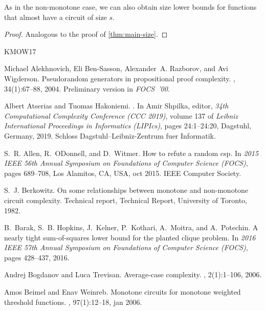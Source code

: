 \documentclass[10pt,a4paper]{article}
\theoremstyle{plain}
\theoremstyle{remark}
\theoremstyle{definition}
\begin{document}
As in the non-monotone case, we can also obtain size lower bounds for
functions that almost have a circuit of size $s$.

\MonotoneSize*

\begin{proof}
  Analogous to the proof of \cref{thm:main-size}.
\end{proof}

\newcommand{\etalchar}[1]{$^{#1}$}
\begin{thebibliography}{KMOW17}

Michael Alekhnovich, Eli {Ben-Sasson}, Alexander~A. Razborov, and Avi
  Wigderson.
\newblock Pseudorandom generators in propositional proof complexity.
, 34(1):67\nobreakdash--88, 2004.
\newblock Preliminary version in \emph{FOCS~'00}.

Albert Atserias and Tuomas Hakoniemi.
.
\newblock In Amir Shpilka, editor, {\em 34th Computational Complexity
  Conference (CCC 2019)}, volume 137 of {\em Leibniz International Proceedings
  in Informatics (LIPIcs)}, pages 24:1--24:20, Dagstuhl, Germany, 2019. Schloss
  Dagstuhl--Leibniz-Zentrum fuer Informatik.

S.~R. Allen, R.~ODonnell, and D.~Witmer.
\newblock How to refute a random csp.
\newblock In {\em 2015 IEEE 56th Annual Symposium on Foundations of Computer
  Science (FOCS)}, pages 689--708, Los Alamitos, CA, USA, oct 2015. IEEE
  Computer Society.

S.~J. Berkowitz.
\newblock On some relationships between monotone and non-monotone circuit
  complexity.
\newblock Technical report, Technical Report, University of Toronto, 1982.

\bibitem[BHK{\etalchar{+}}16]{BHKKMP16clique}
B.~{Barak}, S.~B. {Hopkins}, J.~{Kelner}, P.~{Kothari}, A.~{Moitra}, and
  A.~{Potechin}.
\newblock A nearly tight sum-of-squares lower bound for the planted clique
  problem.
\newblock In {\em 2016 IEEE 57th Annual Symposium on Foundations of Computer
  Science (FOCS)}, pages 428--437, 2016.

Andrej Bogdanov and Luca Trevisan.
\newblock Average-case complexity.
,
  2(1):1--106, 2006.

Amos Beimel and Enav Weinreb.
\newblock Monotone circuits for monotone weighted threshold functions.
, 97(1):12–18, jan 2006.


\end{thebibliography}
\end{document}
